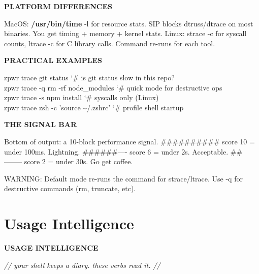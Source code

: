 \documentclass[11pt,a4paper,twoside]{book}
\begin{document}
\vspace{12pt}
{\bfseries\color{neonyellow} PLATFORM DIFFERENCES}\vspace{4pt}

MacOS:  \textbf{\textbf{/usr/bin/time}} -l for resource stats. SIP blocks dtruss/dtrace on most binaries. You get timing + memory + kernel stats. Linux:  strace -c for syscall counts, ltrace -c for C library calls. Command re-runs for each tool.


\vspace{12pt}
{\bfseries\color{neonyellow} PRACTICAL EXAMPLES}\vspace{4pt}

\begin{codebox}
\color{neongreen}zpwr trace git status              {\char`\#} is git status slow in this repo?\\
\color{neongreen}zpwr trace -q rm -rf node\_modules  {\char`\#} quick mode for destructive ops\\
\color{neongreen}zpwr trace -s npm install          {\char`\#} syscalls only (Linux)\\
\color{neongreen}zpwr trace zsh -c 'source \textasciitilde{}/.zshrc' {\char`\#} profile shell startup\\
\end{codebox}


\vspace{12pt}
{\bfseries\color{neonyellow} THE SIGNAL BAR}\vspace{4pt}

Bottom of output: a 10-block performance signal. \#\#\#\#\#\#\#\#\#\#  score 10 = under 100ms. Lightning. \#\#\#\#\#\#----  score 6  = under 2s. Acceptable. \#\#--------  score 2  = under 30s. Go get coffee.

WARNING: Default mode re-runs the command for strace/ltrace. Use -q for destructive commands (rm, truncate, etc).


\vspace{16pt}

\section{Usage Intelligence}


\vspace{10pt}
{\large\bfseries\color{neoncyan} USAGE INTELLIGENCE}\vspace{6pt}

{\small\itshape\color{dimtext} // your shell keeps a diary. these verbs read it. //}
\end{document}
